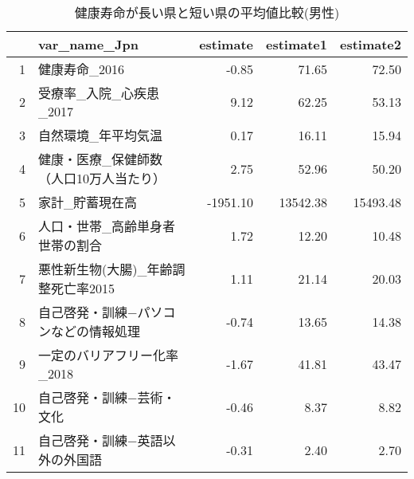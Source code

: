 \begin{table}[ht]
\centering
\caption{健康寿命が長い県と短い県の平均値比較(男性)}
\label{HLE_Ttest_d_m.tex}
\begingroup\tiny

\begin{adjustbox}{width=.7\textwidth}
\begin{tabular}{rlrrr}
  \hline
 & var\_name\_Jpn & estimate & estimate1 & estimate2 \\
  \hline
1 & 健康寿命\_2016 & -0.85 & 71.65 & 72.50 \\
  2 & 受療率\_入院\_心疾患\_2017 & 9.12 & 62.25 & 53.13 \\
  3 & 自然環境\_年平均気温 & 0.17 & 16.11 & 15.94 \\
  4 & 健康・医療\_保健師数（人口10万人当たり） & 2.75 & 52.96 & 50.20 \\
  5 & 家計\_貯蓄現在高 & -1951.10 & 13542.38 & 15493.48 \\
  6 & 人口・世帯\_高齢単身者世帯の割合 & 1.72 & 12.20 & 10.48 \\
  7 & 悪性新生物(大腸)\_年齢調整死亡率2015 & 1.11 & 21.14 & 20.03 \\
  8 & 自己啓発・訓練−パソコンなどの情報処理 & -0.74 & 13.65 & 14.38 \\
  9 & 一定のバリアフリー化率\_2018 & -1.67 & 41.81 & 43.47 \\
  10 & 自己啓発・訓練−芸術・文化 & -0.46 & 8.37 & 8.82 \\
  11 & 自己啓発・訓練−英語以外の外国語 & -0.31 & 2.40 & 2.70 \\
   \hline
\end{tabular}
\end{adjustbox}

\endgroup
\end{table}
